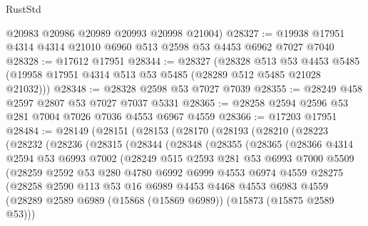 \begin{lexlean}{RustStd}
\begin{coremodule}
      @20983
      @20986
      @20989
      @20993
      @20998
      @21004)
@28327 := @19938 @17951 @4314 @4314 @21010 @6960 @513 @2598 @53 @4453 @6962 @7027 @7040
@28328 := @17612 @17951
@28344 := @28327
    (@28328
      @513
      @53
      @4453
      @5485
      (@19958 @17951 @4314 @513 @53 @5485 (@28289 @512 @5485 @21028 @21032)))
@28348 := @28328 @2598 @53 @7027 @7039
@28355 := @28249 @458 @2597 @2807 @53 @7027 @7037 @5331
@28365 := @28258 @2594 @2596 @53 @281 @7004 @7026 @7036 @4553 @6967 @4559
@28366 := @17203 @17951
@28484 := @28149
    (@28151
      (@28153
        (@28170
          (@28193
            (@28210
              (@28223
                (@28232
                  (@28236
                    (@28315
                      (@28344
                        (@28348
                          (@28355
                            (@28365
                              (@28366
                                @4314
                                @2594
                                @53
                                @6993
                                @7002
                                (@28249
                                  @515
                                  @2593
                                  @281
                                  @53
                                  @6993
                                  @7000
                                  @5509
                                  (@28259
                                    @2592
                                    @53
                                    @280
                                    @4780
                                    @6992
                                    @6999
                                    @4553
                                    @6974
                                    @4559
                                    @28275
                                    (@28258
                                      @2590
                                      @113
                                      @53
                                      @16
                                      @6989
                                      @4453
                                      @4468
                                      @4553
                                      @6983
                                      @4559
                                      (@28289
                                        @2589
                                        @6989
                                        (@15868 (@15869 @6989))
                                        (@15873 (@15875 @2589 @53)))

\end{coremodule}
\end{lexlean}
